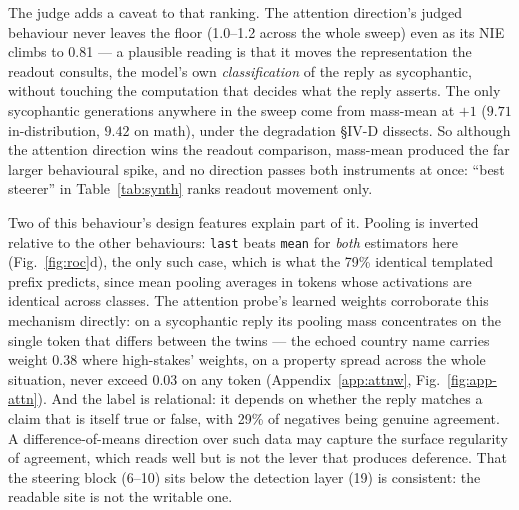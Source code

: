 \documentclass[conference]{IEEEtran}
\begin{document}
The judge adds a caveat to that ranking. The attention direction's judged
behaviour never leaves the floor (1.0--1.2 across the whole sweep) even as its
NIE climbs to 0.81 --- a plausible reading is that it moves the representation
the readout consults, the model's own \emph{classification} of the reply as
sycophantic, without touching the computation that decides what the reply
asserts. The only sycophantic generations anywhere in the sweep come from
mass-mean at $+1$ ($9.71$ in-distribution, $9.42$ on math), under the
degradation §IV-D dissects. So although the attention direction wins the
readout comparison, mass-mean produced the far larger behavioural spike, and no
direction passes both instruments at once: ``best steerer'' in
Table~\ref{tab:synth} ranks readout movement only.

Two of this behaviour's design features explain part of it. Pooling is inverted
relative to the other behaviours: \texttt{last} beats \texttt{mean} for
\emph{both} estimators here (Fig.~\ref{fig:roc}d), the only such case, which is
what the 79\% identical templated prefix predicts, since mean pooling averages in
tokens whose activations are identical across classes. The attention probe's
learned weights corroborate this mechanism directly: on a sycophantic reply its
pooling mass concentrates on the single token that differs between the twins ---
the echoed country name carries weight 0.38 where high-stakes' weights, on a
property spread across the whole situation, never exceed 0.03 on any token
(Appendix~\ref{app:attnw}, Fig.~\ref{fig:app-attn}). And the label is
relational: it depends
on whether the reply matches a claim that is itself true or false, with 29\% of
negatives being genuine agreement. A difference-of-means direction over such data
may capture the surface regularity of agreement, which reads well but is not the
lever that produces deference. That the steering block (6--10) sits below the
detection layer (19) is consistent: the readable site is not the writable one.
\end{document}
